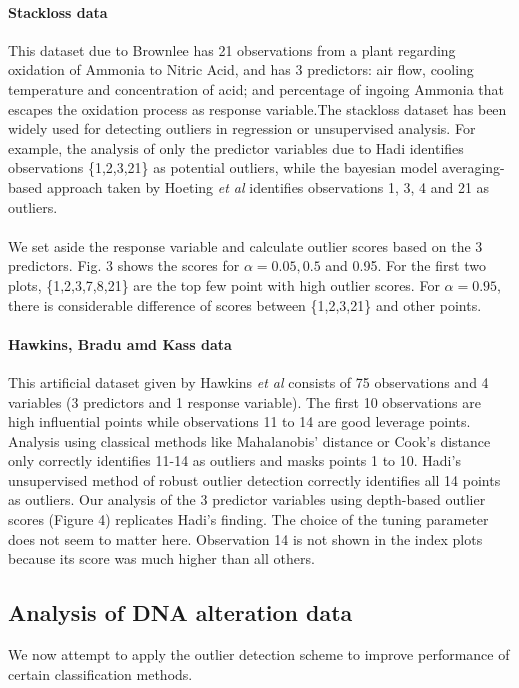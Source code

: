 \documentclass[10pt]{article}
\begin{document}
\paragraph{Stackloss data}This dataset due to Brownlee \cite{stackloss} has 21 observations from a plant regarding oxidation of Ammonia to Nitric Acid, and has 3 predictors: air flow, cooling temperature and concentration of acid; and percentage of ingoing Ammonia that escapes the oxidation process as response variable.The stackloss dataset has been widely used for detecting outliers in regression or unsupervised analysis. For example, the analysis of only the predictor variables due to Hadi \cite{hadi92} identifies observations \{1,2,3,21\} as potential outliers, while the bayesian model averaging-based approach taken by Hoeting \textit{et al}\cite{hoeting96} identifies observations 1, 3, 4 and 21 as outliers.

\paragraph{}We set aside the response variable and calculate outlier scores based on the 3 predictors. Fig. 3 shows the scores for $\alpha = 0.05, 0.5$ and 0.95. For the first two plots, \{1,2,3,7,8,21\} are the top few point with high outlier scores. For $\alpha = 0.95$, there is considerable difference of scores between \{1,2,3,21\} and other points.

\paragraph{Hawkins, Bradu amd Kass data}This artificial dataset given by Hawkins \textit{et al} \cite{hbk} consists of 75 observations and 4 variables (3 predictors and 1 response variable). The first 10 observations are high influential points while observations 11 to 14 are good leverage points. Analysis using classical methods like Mahalanobis' distance or Cook's distance only correctly identifies 11-14 as outliers and masks points 1 to 10. Hadi's unsupervised method of robust outlier detection \cite{hadi92} correctly identifies all 14 points as outliers. Our analysis of the 3 predictor variables using depth-based outlier scores (Figure 4) replicates Hadi's finding. The choice of the tuning parameter does not seem to matter here. Observation 14 is not shown in the index plots because its score was much higher than all others.

\subsection{Analysis of DNA alteration data}We now attempt to apply the outlier detection scheme to improve performance of certain classification methods.
\end{document}
